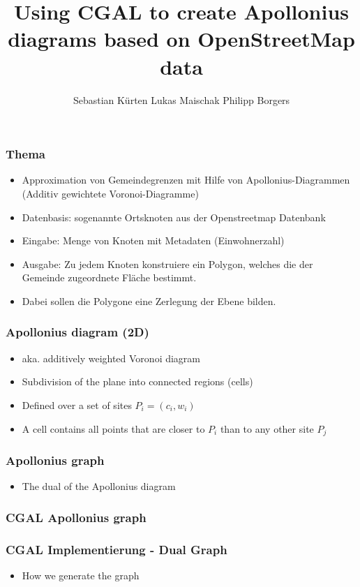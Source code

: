 \documentclass{beamer}
\title{Using CGAL to create Apollonius diagrams based on OpenStreetMap data}
\author[Sebastian Kürten, Philipp Borgers, Lukas Maischak]{
    Sebastian Kürten
    \newline Lukas Maischak
    \newline Philipp Borgers
}
\begin{document}
\begin{frame}
    \titlepage
\end{frame}

\begin{frame}
    \frametitle{Thema}
    \begin{itemize}
        \item Approximation von Gemeindegrenzen mit Hilfe von Apollonius-Diagrammen
        (Additiv gewichtete Voronoi-Diagramme)
        \item Datenbasis: sogenannte Ortsknoten aus der Openstreetmap Datenbank
        \item Eingabe: Menge von Knoten mit Metadaten (Einwohnerzahl)
        \item Ausgabe: Zu jedem Knoten konstruiere ein Polygon, welches die der Gemeinde
        zugeordnete Fläche bestimmt.
        \item Dabei sollen die Polygone eine Zerlegung der Ebene bilden.
    \end{itemize}
\end{frame}

\begin{frame}
    \frametitle{Apollonius diagram (2D)}
    \begin{itemize}
        \item aka. additively weighted Voronoi diagram
        \item Subdivision of the plane into connected regions (cells)
        \item Defined over a set of sites $P_i = (c_i, w_i)$
        \item A cell contains all points that are closer to $P_i$ than to any
            other site $P_j$
    \end{itemize}
\end{frame}

\begin{frame}
    \frametitle{Apollonius graph}
    \begin{itemize}
        \item The dual of the Apollonius diagram
    \end{itemize}
\end{frame}

\begin{frame}
    \frametitle{CGAL Apollonius graph}
    
\end{frame}

\begin{frame}
    \frametitle{CGAL Implementierung - Dual Graph}
    \begin{itemize}
        \item How we generate the graph
    \end{itemize}
\end{frame}
\end{document}

